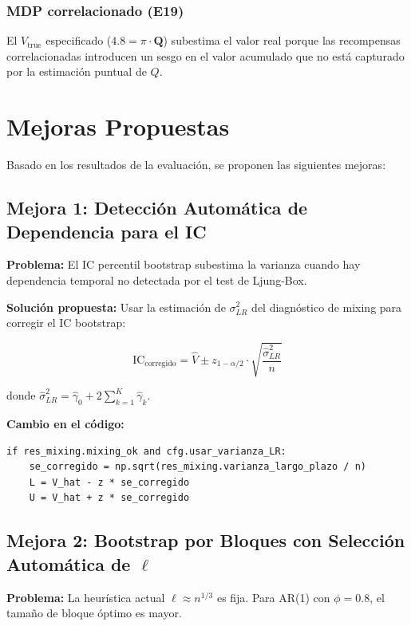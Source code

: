 \documentclass[12pt,a4paper]{article}
\begin{document}
\subsubsection{MDP correlacionado (E19)}

El $V_{\text{true}}$ especificado ($4.8 = \pi \cdot \mathbf{Q}$) subestima el valor real porque las recompensas correlacionadas introducen un sesgo en el valor acumulado que no está capturado por la estimación puntual de $Q$.

\section{Mejoras Propuestas}

Basado en los resultados de la evaluación, se proponen las siguientes mejoras:

\subsection{Mejora 1: Detección Automática de Dependencia para el IC}

\textbf{Problema:} El IC percentil bootstrap subestima la varianza cuando hay dependencia temporal no detectada por el test de Ljung-Box.

\textbf{Solución propuesta:} Usar la estimación de $\sigma^2_{LR}$ del diagnóstico de mixing para corregir el IC bootstrap:

\[
\text{IC}_{\text{corregido}} = \hat{V} \pm z_{1-\alpha/2} \cdot \sqrt{\frac{\hat{\sigma}^2_{LR}}{n}}
\]

donde $\hat{\sigma}^2_{LR} = \hat{\gamma}_0 + 2\sum_{k=1}^{K} \hat{\gamma}_k$.

\textbf{Cambio en el código:}
\begin{lstlisting}
if res_mixing.mixing_ok and cfg.usar_varianza_LR:
    se_corregido = np.sqrt(res_mixing.varianza_largo_plazo / n)
    L = V_hat - z * se_corregido
    U = V_hat + z * se_corregido
\end{lstlisting}

\subsection{Mejora 2: Bootstrap por Bloques con Selección Automática de $\ell$}

\textbf{Problema:} La heurística actual $\ell \approx n^{1/3}$ es fija. Para AR(1) con $\phi=0.8$, el tamaño de bloque óptimo es mayor.
\end{document}
